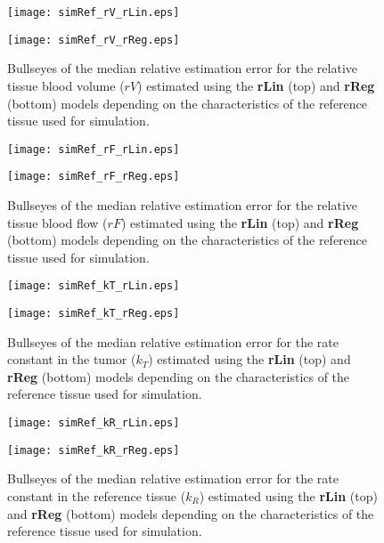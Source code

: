 \begin{subfigures}
    \begin{figure}
        \texttt{[image: simRef\_rV\_rLin.eps]}
        \par\vspace{1cm}
        \texttt{[image: simRef\_rV\_rReg.eps]}
        \caption{Bullseyes of the median relative estimation error for the relative tissue blood volume ($rV$) estimated using the \textbf{rLin} (top) and \textbf{rReg} (bottom) models depending on the characteristics of the reference tissue used for simulation.}
        \label{fig:referenceTissue_rV}
    \end{figure}
    \begin{figure}
        \texttt{[image: simRef\_rF\_rLin.eps]}
        \par\vspace{1cm}
        \texttt{[image: simRef\_rF\_rReg.eps]}
        \caption{Bullseyes of the median relative estimation error for the relative tissue blood flow ($rF$) estimated using the \textbf{rLin} (top) and \textbf{rReg} (bottom) models depending on the characteristics of the reference tissue used for simulation.}
        \label{fig:referenceTissue_rF}
    \end{figure}
    \begin{figure}
        \texttt{[image: simRef\_kT\_rLin.eps]}
        \par\vspace{1cm}
        \texttt{[image: simRef\_kT\_rReg.eps]}
        \caption{Bullseyes of the median relative estimation error for the rate constant in the tumor ($k_T$) estimated using the \textbf{rLin} (top) and \textbf{rReg} (bottom) models depending on the characteristics of the reference tissue used for simulation.}
        \label{fig:referenceTissue_kT}
    \end{figure}
    \begin{figure}
        \texttt{[image: simRef\_kR\_rLin.eps]}
        \par\vspace{1cm}
        \texttt{[image: simRef\_kR\_rReg.eps]}
        \caption{Bullseyes of the median relative estimation error for the rate constant in the reference tissue ($k_R$) estimated using the \textbf{rLin} (top) and \textbf{rReg} (bottom) models depending on the characteristics of the reference tissue used for simulation.}
        \label{fig:referenceTissue_kR}
    \end{figure}
\end{subfigures}
\FloatBarrier

